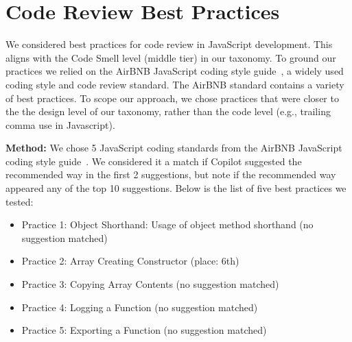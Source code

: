 \section{Code Review Best Practices}
We considered best practices for code review in JavaScript development. 
This aligns with the Code Smell level (middle tier) in our taxonomy. 
To ground our practices we relied on the AirBNB JavaScript coding style guide~\cite{airbnb_code}, a widely used coding style and code review standard. 
The AirBNB standard contains a variety of best practices. 
To scope our approach, we chose practices that were closer to the the design level of our taxonomy, rather than the code level (e.g., trailing comma use in Javascript).


\noindent\textbf{Method:} We chose 5 JavaScript coding standards from the AirBNB JavaScript coding style guide~\cite{airbnb_code}. We considered it a match if Copilot suggested the recommended way in the first 2 suggestions, but note if the recommended way appeared any of the top 10 suggestions. 
Below is the list of five best practices we tested:

\begin{itemize}
    \item Practice 1: Object Shorthand: Usage of object method shorthand (no suggestion matched)
    \item Practice 2: Array Creating Constructor (place: 6th)
    \item Practice 3: Copying Array Contents (no suggestion matched)
    \item Practice 4: Logging a Function (no suggestion matched)
    \item Practice 5: Exporting a Function (no suggestion matched)
\end{itemize}

